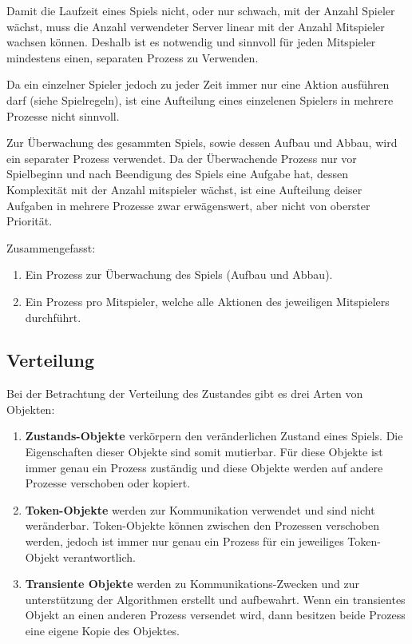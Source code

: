 
Damit die Laufzeit eines Spiels nicht, oder nur schwach, mit der Anzahl Spieler wächst, muss die Anzahl verwendeter Server linear mit der Anzahl Mitspieler wachsen können. Deshalb ist es notwendig und sinnvoll für jeden Mitspieler mindestens einen, separaten Prozess zu Verwenden.

Da ein einzelner Spieler jedoch zu jeder Zeit immer nur eine Aktion ausführen darf (siehe Spielregeln), ist eine Aufteilung eines einzelenen Spielers in mehrere Prozesse nicht sinnvoll.

Zur Überwachung des gesammten Spiels, sowie dessen Aufbau und Abbau, wird ein separater Prozess verwendet. Da der Überwachende Prozess nur vor Spielbeginn und nach Beendigung des Spiels eine Aufgabe hat, dessen Komplexität mit der Anzahl mitspieler wächst, ist eine Aufteilung deiser Aufgaben in mehrere Prozesse zwar erwägenswert, aber nicht von oberster Priorität.


Zusammengefasst:

\begin{enumerate}
	\item Ein Prozess zur Überwachung des Spiels (Aufbau und Abbau).
	\item Ein Prozess pro Mitspieler, welche alle Aktionen des jeweiligen Mitspielers durchführt.
\end{enumerate}

\subsection{Verteilung}


Bei der Betrachtung der Verteilung des Zustandes gibt es drei Arten von Objekten:

\begin{enumerate}
	\item {\bf Zustands-Objekte} verkörpern den veränderlichen Zustand eines Spiels. Die Eigenschaften dieser Objekte sind somit mutierbar. Für diese Objekte ist immer genau ein Prozess zuständig und diese Objekte werden auf andere Prozesse verschoben oder kopiert.
	\item {\bf Token-Objekte} werden zur Kommunikation verwendet und sind nicht weränderbar. Token-Objekte können zwischen den Prozessen verschoben werden, jedoch ist immer nur genau ein Prozess für ein jeweiliges Token-Objekt verantwortlich.
	\item {\bf Transiente Objekte} werden zu Kommunikations-Zwecken und zur unterstützung der Algorithmen erstellt und aufbewahrt. Wenn ein transientes Objekt an einen anderen Prozess versendet wird, dann besitzen beide Prozess eine eigene Kopie des Objektes.
\end{enumerate}

